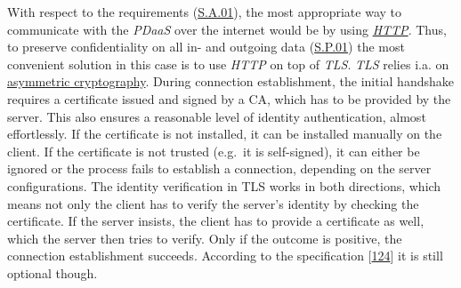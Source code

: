 \documentclass[12pt,english,a4paper,titlepage,cleardoublepage=empty,dottedtoc]{report}
\begin{document}
With respect to the requirements (\protect\hyperlink{sa01}{S.A.01}), the
most appropriate way to communicate with the \emph{PDaaS} over the
internet would be by using \emph{\protect\hyperlink{def--http}{HTTP}}.
Thus, to preserve confidentiality on all in- and outgoing data
(\protect\hyperlink{sp01}{S.P.01}) the most convenient solution in this
case is to use \emph{HTTP} on top of \emph{TLS}. \emph{TLS} relies i.a.
on \protect\hyperlink{def--asym-crypto}{asymmetric cryptography}. During
connection establishment, the initial handshake requires a certificate
issued and signed by a CA, which has to be provided by the server. This
also ensures a reasonable level of identity authentication, almost
effortlessly. If the certificate is not installed, it can be installed
manually on the client. If the certificate is not trusted (e.g.~it is
self-signed), it can either be ignored or the process fails to establish
a connection, depending on the server configurations. The identity
verification in TLS works in both directions, which means not only the
client has to verify the server's identity by checking the certificate.
If the server insists, the client has to provide a certificate as well,
which the server then tries to verify. Only if the outcome is positive,
the connection establishment succeeds. According to the specification
{[}\protect\hyperlink{ref-web_spec_tls-12_client-auth}{124}{]} it is
still optional though.
\end{document}
